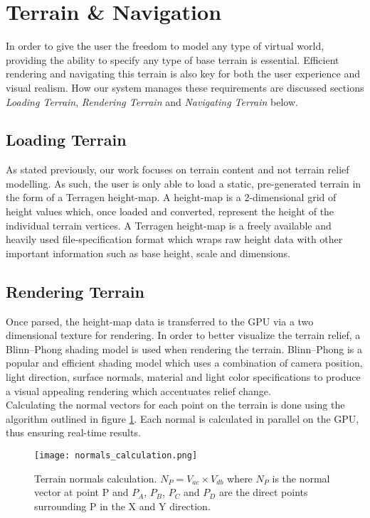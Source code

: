 \section{Terrain \& Navigation}

In order to give the user the freedom to model any type of virtual world, providing the ability to specify any type of base terrain is essential. Efficient rendering and navigating this terrain is also key for both the user experience and visual realism. How our system manages these requirements are discussed sections \textit{Loading Terrain}, \textit{Rendering Terrain} and \textit{Navigating Terrain} below.

\subsection{Loading Terrain}

As stated previously, our work focuses on terrain content and not terrain relief modelling. As such, the user is only able to load a static, pre-generated terrain in the form of a Terragen height-map. A height-map is a 2-dimensional grid of height values which, once loaded and converted, represent the height of the individual terrain vertices. A Terragen height-map is a freely available and heavily used file-specification format which wraps raw height data with other important information such as base height, scale and dimensions.

\subsection{Rendering Terrain}

Once parsed, the height-map data is transferred to the GPU via a two dimensional texture for rendering. In order to better visualize the terrain relief, a Blinn–Phong shading model is used when rendering the terrain. Blinn–Phong is a popular and efficient shading model which uses a combination of camera position, light direction, surface normals, material and light color specifications to produce a visual appealing rendering which accentuates relief change.\\
Calculating the normal vectors for each point on the terrain is done using the algorithm outlined in figure \ref{fig:normals_calculation}. Each normal is calculated in parallel on the GPU, thus ensuring real-time results.

\begin{figure}[h]
\center
	\label{fig:normals_calculation}
	\texttt{[image: normals\_calculation.png]}
	\caption{Terrain normals calculation. $N_{P} = V_{ac} \times V_{db} $ where $N_{P}$ is the normal vector at point P and $P_{A}$, $P_{B}$, $P_{C}$ and $P_{D}$ are the direct points surrounding P in the X and Y direction. }
\end{figure}

